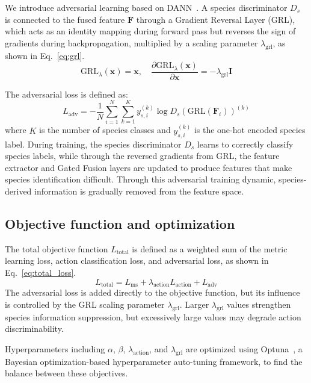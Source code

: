 \documentclass[twocolumn]{svjour3}
\begin{document}
We introduce adversarial learning based on DANN~\cite{ganin2016domain}.
A species discriminator $D_s$ is connected to the fused feature $\mathbf{F}$ through a Gradient Reversal Layer (GRL), which acts as an identity mapping during forward pass but reverses the sign of gradients during backpropagation, multiplied by a scaling parameter $\lambda_{\mathrm{grl}}$, as shown in Eq.~\eqref{eq:grl}.
\begin{equation}
  \mathrm{GRL}_{\lambda}(\mathbf{x}) = \mathbf{x}, \quad
  \frac{\partial \mathrm{GRL}_{\lambda}(\mathbf{x})}{\partial \mathbf{x}} = -\lambda_{\mathrm{grl}} \mathbf{I}
  \label{eq:grl}
\end{equation}

The adversarial loss is defined as:
\begin{equation}
  L_{\mathrm{adv}} = -\frac{1}{N} \sum_{i=1}^{N} \sum_{k=1}^{K} y_{s,i}^{(k)} \log D_s(\mathrm{GRL}(\mathbf{F}_i))^{(k)}
  \label{eq:adv_loss}
\end{equation}
where $K$ is the number of species classes and $y_{s,i}^{(k)}$ is the one-hot encoded species label.
During training, the species discriminator $D_s$ learns to correctly classify species labels, while through the reversed gradients from GRL, the feature extractor and Gated Fusion layers are updated to produce features that make species identification difficult.
Through this adversarial training dynamic, species-derived information is gradually removed from the feature space.

\subsection{Objective function and optimization}

The total objective function $L_{\mathrm{total}}$ is defined as a weighted sum of the metric learning loss, action classification loss, and adversarial loss, as shown in Eq.~\eqref{eq:total_loss}.
\begin{equation}
  L_{\mathrm{total}} = L_{\mathrm{ms}} + \lambda_{\mathrm{action}} L_{\mathrm{action}} + L_{\mathrm{adv}}
  \label{eq:total_loss}
\end{equation}
The adversarial loss is added directly to the objective function, but its influence is controlled by the GRL scaling parameter $\lambda_{\mathrm{grl}}$.
Larger $\lambda_{\mathrm{grl}}$ values strengthen species information suppression, but excessively large values may degrade action discriminability.

Hyperparameters including $\alpha$, $\beta$, $\lambda_{\mathrm{action}}$, and $\lambda_{\mathrm{grl}}$ are optimized using Optuna~\cite{akiba2019optuna}, a Bayesian optimization-based hyperparameter auto-tuning framework, to find the balance between these objectives.
\end{document}
